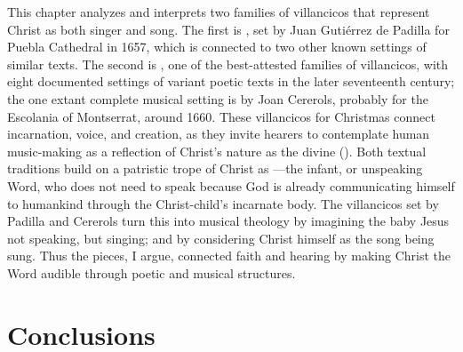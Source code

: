 This chapter analyzes and interprets two families of villancicos that represent
Christ as both singer and song.
The first is , set by Juan Gutiérrez de Padilla
for Puebla Cathedral in 1657, which is connected to two other known settings of
similar texts.
The second is , one of the
best-attested families of villancicos, with eight documented settings of variant
poetic texts in the later seventeenth century; the one extant complete musical
setting is by Joan Cererols, probably for the Escolania of Montserrat, around
1660.
These villancicos for Christmas connect incarnation, voice, and creation, as
they invite hearers to contemplate human music-making as a reflection of
Christ's nature as the divine  ().
Both textual traditions build on a patristic trope of Christ as
---the infant, or unspeaking Word, who does not need to
speak because God is already communicating himself to humankind through the
Christ-child's incarnate body.
The villancicos set by Padilla and Cererols turn this into musical theology by
imagining the baby Jesus not speaking, but singing; and by considering Christ
himself as the song being sung.
Thus the pieces, I argue, connected faith and hearing by making Christ the Word
audible through poetic and musical structures.






\section{Conclusions}
